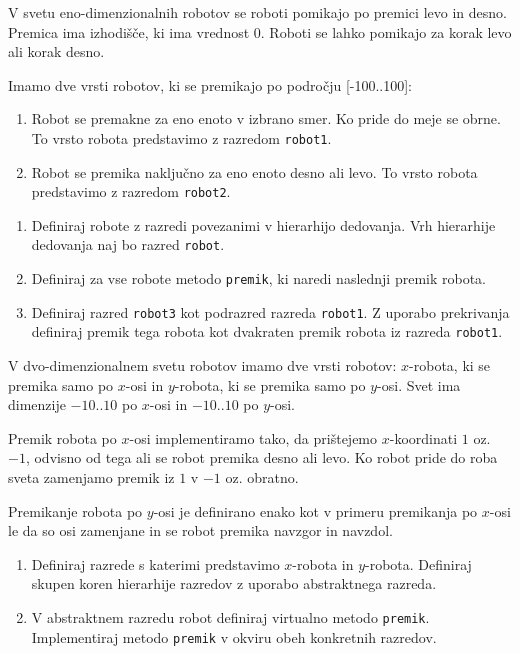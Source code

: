 \begin{ex}
  V svetu eno-dimenzionalnih robotov se roboti pomikajo po premici
  levo in desno. Premica ima izhodi\v s\v ce, ki ima vrednost
  0. Roboti se lahko pomikajo za korak levo ali korak desno. 

  Imamo dve vrsti robotov, ki se premikajo po podro\v cju [-100..100]:

  \begin{enumerate}
  \item Robot se premakne za eno enoto v izbrano smer. Ko pride do
    meje se obrne. To vrsto robota predstavimo z razredom
    \lstinline{robot1}.

  \item Robot se premika naklju\v cno za eno enoto desno ali levo. To
    vrsto robota predstavimo z razredom \lstinline{robot2}.
  \end{enumerate}

  \begin{enumerate}[label=(\roman*)]
  \item Definiraj robote z razredi povezanimi v hierarhijo
    dedovanja. Vrh hierarhije dedovanja naj bo razred \lstinline{robot}.

  \item Definiraj za vse robote metodo \lstinline{premik}, ki naredi
    naslednji premik robota.

  \item Definiraj razred \lstinline{robot3} kot podrazred razreda
    \lstinline{robot1}. Z uporabo prekrivanja definiraj premik tega
    robota kot dvakraten premik robota iz razreda \lstinline{robot1}.
  \end{enumerate}


\end{ex} 
\begin{ex}
  V dvo-dimenzionalnem svetu robotov imamo dve vrsti robotov:
  $x$-robota, ki se premika samo po $x$-osi in $y$-robota, ki se premika
  samo po $y$-osi. Svet ima dimenzije $-10..10$ po $x$-osi
  in $-10..10$ po $y$-osi.

  Premik robota po $x$-osi implementiramo tako, da pri\v stejemo
  $x$-koordinati $1$ oz. $-1$, odvisno od tega ali 
  se robot premika desno
  ali levo. Ko robot pride do roba sveta zamenjamo premik iz $1$
  v $-1$
  oz. obratno.

  Premikanje robota po $y$-osi je definirano enako kot v primeru
  premikanja po $x$-osi le da so osi zamenjane in se robot premika
  navzgor in navzdol.

  \begin{enumerate}
  \item Definiraj razrede s katerimi predstavimo $x$-robota in
    $y$-robota. Definiraj skupen koren hierarhije razredov z uporabo
    abstraktnega razreda.

  \item V abstraktnem razredu robot definiraj virtualno metodo
    \lstinline{premik}. Implementiraj metodo \lstinline{premik} v
    okviru obeh konkretnih razredov.
  \end{enumerate}


\end{ex} 
